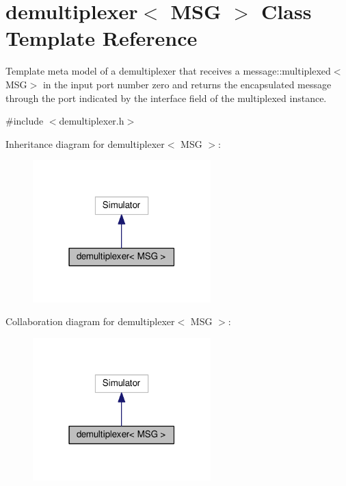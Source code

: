\hypertarget{classdemultiplexer}{}\section{demultiplexer$<$ M\+SG $>$ Class Template Reference}
\label{classdemultiplexer}


Template meta model of a demultiplexer that receives a message\+::multiplexed$<$\+M\+S\+G$>$ in the input port number zero and returns the encapsulated message through the port indicated by the interface field of the multiplexed instance.  




{\ttfamily \#include $<$demultiplexer.\+h$>$}



Inheritance diagram for demultiplexer$<$ M\+SG $>$\+:\nopagebreak
\begin{figure}[H]
\begin{center}
\leavevmode
\includegraphics[width=195pt]{classdemultiplexer__inherit__graph}
\end{center}
\end{figure}


Collaboration diagram for demultiplexer$<$ M\+SG $>$\+:\nopagebreak
\begin{figure}[H]
\begin{center}
\leavevmode
\includegraphics[width=195pt]{classdemultiplexer__coll__graph}
\end{center}
\end{figure}
